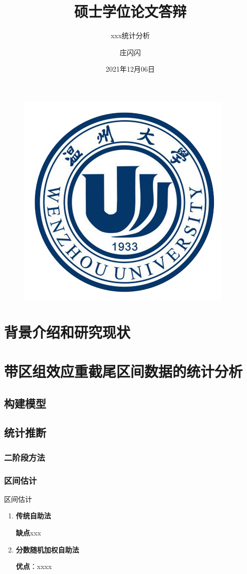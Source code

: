 \documentclass{beamer}
\author{庄闪闪}
\title{硕士学位论文答辩}
\subtitle{xxx统计分析}
\institute{xxx学院}
\date{2021年12月06日}
\begin{document}
\kaishu
\begin{frame}
    \titlepage
    \begin{figure}[htpb]
        \begin{center}
            \includegraphics[width=0.2\linewidth]{pic/wzu_logo.png}
        \end{center}
    \end{figure}
\end{frame}

\begin{frame}
    \tableofcontents[sectionstyle=show,subsectionstyle=show/shaded/hide,subsubsectionstyle=show/shaded/hide]
\end{frame}


\section{背景介绍和研究现状}







\section{带区组效应重截尾区间数据的统计分析}



\subsection{构建模型}


\subsection{统计推断}

\subsubsection{二阶段方法}


\subsubsection{区间估计}

\begin{frame}{区间估计}
\begin{enumerate}
	\item \textbf{传统自助法}
	
	\textbf{缺点}xxx
	
	\item \textbf{分数随机加权自助法}
	
	\textbf{优点}：xxxx
\end{enumerate}
\end{frame}	
\end{document}
